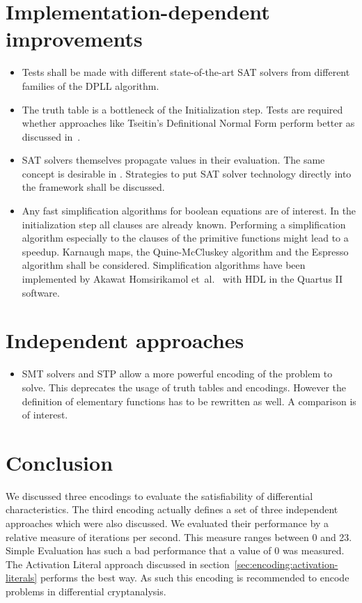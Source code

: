 \section{Implementation-dependent improvements}
%
\begin{itemize}
  \item Tests shall be made with different state-of-the-art SAT solvers from different families of the DPLL algorithm.
  \item The truth table is a bottleneck of the Initialization step. Tests are required whether approaches like Tseitin's Definitional Normal Form perform better as discussed in~\cite{Sat03}.
  \item SAT solvers themselves propagate values in their evaluation. The same concept is desirable in \nltool. Strategies to put SAT solver technology directly into the framework shall be discussed.
  \item Any fast simplification algorithms for boolean equations are of interest. In the initialization step all clauses are already known. Performing a simplification algorithm especially to the clauses of the primitive functions might lead to a speedup. Karnaugh maps, the Quine-McCluskey algorithm and the Espresso algorithm shall be considered. Simplification algorithms have been implemented by Akawat Homsirikamol et~al.~\cite{Cry04} with HDL in the Quartus II software.
\end{itemize}

\section{Independent approaches}
%
\begin{itemize}
  \item SMT solvers and STP allow a more powerful encoding of the problem to solve. This deprecates the usage of truth tables and encodings. However the definition of elementary functions has to be rewritten as well. A comparison is of interest.
\end{itemize}


\section{Conclusion}
%
We discussed three encodings to evaluate the satisfiability of differential characteristics. The third encoding actually defines a set of three independent approaches which were also discussed. We evaluated their performance by a relative measure of iterations per second. This measure ranges between 0 and 23. Simple Evaluation has such a bad performance that a value of $0$ was measured. The Activation Literal approach discussed in section~\ref{sec:encoding:activation-literals} performs the best way. As such this encoding is recommended to encode problems in differential cryptanalysis.

